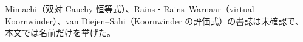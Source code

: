 \printbibliography[title={参考文献}]
\noindent Mimachi（双対 Cauchy 恒等式）、Rains・Rains--Warnaar（virtual Koornwinder）、van Diejen--Sahi（Koornwinder の評価式）の書誌は未確認で、本文では名前だけを挙げた。
